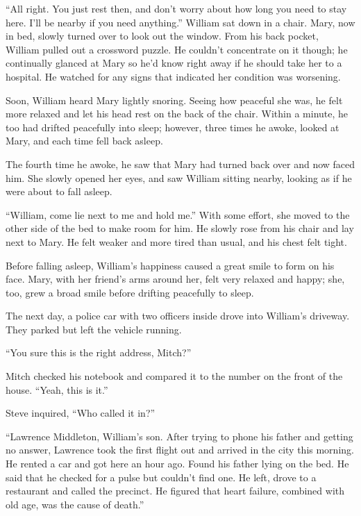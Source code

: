 “All right. You just rest then, and don't worry about how long you need to stay here. I'll be nearby if you need anything.” William sat down in a chair. Mary, now in bed, slowly turned over to look out the window. From his back pocket, William pulled out a crossword puzzle. He couldn't concentrate on it though; he continually glanced at Mary so he'd know right away if he should take her to a hospital. He watched for any signs that indicated her condition was worsening.

Soon, William heard Mary lightly snoring. Seeing how peaceful she was, he felt more relaxed and let his head rest on the back of the chair. Within a minute, he too had drifted peacefully into sleep; however, three times he awoke, looked at Mary, and each time fell back asleep.

The fourth time he awoke, he saw that Mary had turned back over and now faced him. She slowly opened her eyes, and saw William sitting nearby, looking as if he were about to fall asleep.

“William, come lie next to me and hold me.” With some effort, she moved to the other side of the bed to make room for him. He slowly rose from his chair and lay next to Mary. He felt weaker and more tired than usual, and his chest felt tight.

Before falling asleep, William's happiness caused a great smile to form on his face. Mary, with her friend's arms around her, felt very relaxed and happy; she, too, grew a broad smile before drifting peacefully to sleep.



\timesep





The next day, a police car with two officers inside drove into William's driveway. They parked but left the vehicle running.

“You sure this is the right address, Mitch?”

Mitch checked his notebook and compared it to the number on the front of the house. “Yeah, this is it.”

Steve inquired, “Who called it in?”

“Lawrence Middleton, William's son. After trying to phone his father and getting no answer, Lawrence took the first flight out and arrived in the city this morning. He rented a car and got here an hour ago. Found his father lying on the bed. He said that he checked for a pulse but couldn't find one. He left, drove to a restaurant and called the precinct. He figured that heart failure, combined with old age, was the cause of death.”

